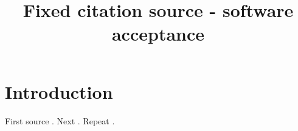 \documentclass[11pt]{article}
\begin{document}
\title{Fixed citation source - software acceptance}
\maketitle
\section{Introduction}
First source \citep{evidence_6b169de2b78d452f919391b00916f2c8}. Next \citep{evidence_b5348fa59b3948ae9540b75a33ca9bd9}. Repeat \citep{evidence_6b169de2b78d452f919391b00916f2c8}.



\end{document}
